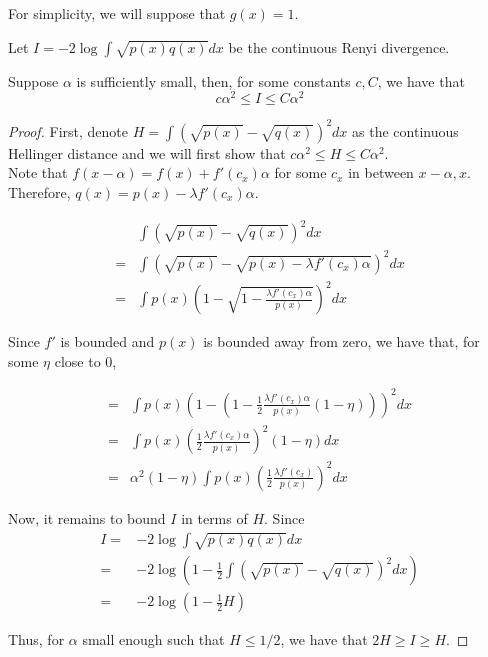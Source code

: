 \documentclass{article}
\begin{document}
For simplicity, we will suppose that $g(x) = 1$.

\begin{proposition}
Let $I = -2 \log \int \sqrt{p(x)q(x)} dx$ be the continuous Renyi divergence.

Suppose $\alpha$ is sufficiently small, then, for some constants $c,C$, we have that
\[
c \alpha^2 \leq I \leq C \alpha^2
\]
\end{proposition}

\begin{proof}

First, denote $H = \int (\sqrt{p(x)} - \sqrt{q(x)})^2 dx$ as the continuous Hellinger distance and we will first show that $c \alpha^2 \leq H \leq C \alpha^2$.\\

Note that $f(x-\alpha) = f(x) + f'(c_x) \alpha$ for some $c_x$ in between $x-\alpha, x$. Therefore, $q(x) = p(x) - \lambda f'(c_x) \alpha$. 

\begin{align*}
&\int (\sqrt{p(x)} - \sqrt{q(x)})^2 dx \\
=& \int ( \sqrt{p(x)} - \sqrt{p(x) - \lambda f'(c_x) \alpha} )^2 dx \\
=& \int p(x) \left( 1 - \sqrt{ 1 - \frac{\lambda f'(c_x) \alpha}{p(x)}} \right)^2 dx 
\end{align*}

Since $f'$ is bounded and $p(x)$ is bounded away from zero, we have that, for some $\eta$ close to 0,

\begin{align*}
=& \int p(x) \left( 1 - (1 - \frac{1}{2} \frac{\lambda f'(c_x) \alpha}{p(x)} (1 - \eta) ) \right)^2 dx \\
=& \int p(x) \left( \frac{1}{2} \frac{\lambda f'(c_x) \alpha}{p(x)} \right)^2 (1-\eta) dx\\
=& \alpha^2 (1-\eta) \int p(x) \left( \frac{1}{2} \frac{\lambda f'(c_x) }{p(x)} \right)^2 dx
\end{align*}

Now, it remains to bound $I$ in terms of $H$. Since
\begin{align*}
I =& -2 \log \int \sqrt{p(x)q(x)} dx \\
 =& -2 \log \left( 1 - \frac{1}{2} \int (\sqrt{p(x)} - \sqrt{q(x)})^2 dx \right) \\
 =& -2 \log (1 - \frac{1}{2} H) 
\end{align*}

Thus, for $\alpha$ small enough such that $H \leq 1/2$, we have that $2 H \geq I \geq H$. 
\end{proof}
\end{document}
